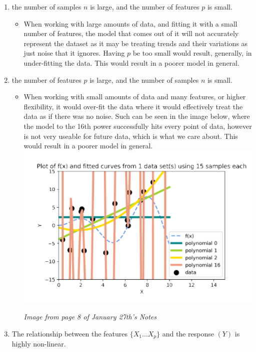 \documentclass[11pt]{article}
\begin{document}
\begin{enumerate}[label=(\alph*)]
    \item the number of samples $n$ is large, and the number of features $p$ is small.
          \begin{itemize}
              \item When working with large amounts of data, and fitting it with a small number of features, the model that comes out of it will not accurately represent the dataset as it may be treating trends and their variations as just noise that it ignores. Having $p$ be too small would result, generally, in under-fitting the data. This would result in a poorer model in general.
          \end{itemize}
    \item the number of features $p$ is large, and the number of samples $n$ is small.
          \begin{itemize}
              \item When working with small amounts of data and many features, or higher flexibility, it would over-fit the data where it would effectively treat the data as if there was no noise. Such can be seen in the image below, where the model to the 16th power successfully hits every point of data, however is not very useable for future data, which is what we care about. This would result in a poorer model in general.\\
                    \includegraphics{1b.png}
                    \begin{center}
                        \emph{Image from page 8 of January 27th's Notes}
                    \end{center}
          \end{itemize}
    \item The relationship between the features $\{X_1 ... X_p\}$ and the response $(Y)$ is highly non-linear.

\end{enumerate}
\end{document}
